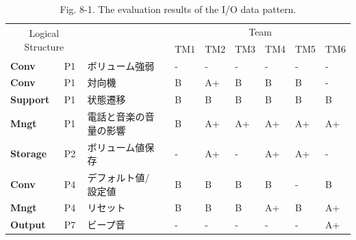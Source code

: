 \begin{table}[htbp]
\centering
\caption{Fig. 8-1. The evaluation results of the I/O data pattern.}
  \begin{tabular}{|l|l|l|r|l|l|l|l|l|l|}
  \hline
  \multicolumn{2}{|c}{\multirow{2}[4]{*}{Logical
Structure}} & \multicolumn{1}{r}{} &       & \multicolumn{6}{c|}{Team} \bigstrut\\
\cline{5-10}    \multicolumn{2}{|c}{} & \multicolumn{1}{r}{} &       & TM1   & TM2   & TM3   & TM4   & TM5   & TM6 \bigstrut\\
  \hline
  \textbf{Conv} & P1    & ボリューム強弱 &       & -     & -     & -     & -     & -     & - \bigstrut\\
  \hline
  \textbf{Conv} & P1    & 対向機   &       & B     & A+    & B     & B     & B     & - \bigstrut\\
  \hline
  \textbf{Support} & P1    & 状態遷移  &       & B     & B     & B     & B     & B     & B \bigstrut\\
  \hline
  \textbf{Mngt} & P1    & 電話と音楽の音量の影響 &       & B     & A+    & A+    & A+    & A+    & A+ \bigstrut\\
  \hline
  \textbf{Storage} & P2    & ボリューム値保存 &       & -     & A+    & -     & A+    & A+    & - \bigstrut\\
  \hline
  \textbf{Conv} & P4    & デフォルト値/設定値 &       & B     & B     & B     & B     & -     & B \bigstrut\\
  \hline
  \textbf{Mngt} & P4    & リセット  &       & B     & B     & B     & A+    & B     & A+ \bigstrut\\
  \hline
  \textbf{Output} & P7    & ビープ音  &       & -     & -     & -     & -     & -     & A+ \bigstrut\\
  \hline
  \end{tabular}%
\label{tbl:D-3-tbl7}%
\end{table}%

